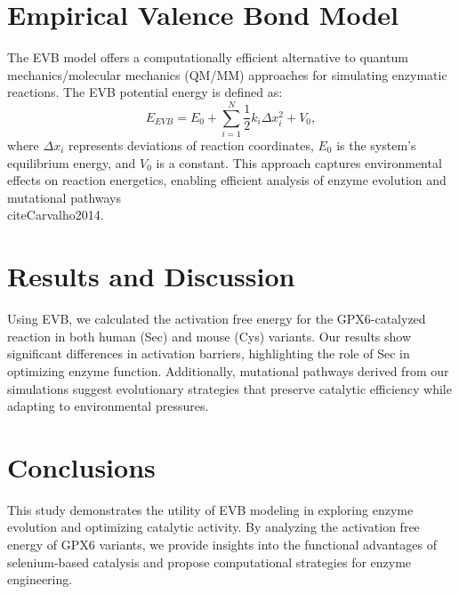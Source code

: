 \documentclass[journal=jacsat,manuscript=article]{achemso}
\begin{document}
\section{Empirical Valence Bond Model}

The EVB model offers a computationally efficient alternative to quantum mechanics/molecular mechanics (QM/MM) approaches for simulating enzymatic reactions. The EVB potential energy is defined as:
\begin{equation}
    E_{EVB} = E_{0} + \sum_{i=1}^{N} \frac{1}{2} k_i \Delta x_i^2 + V_{0},
\end{equation}
where \(\Delta x_i\) represents deviations of reaction coordinates, \(E_0\) is the system's equilibrium energy, and \(V_0\) is a constant. This approach captures environmental effects on reaction energetics, enabling efficient analysis of enzyme evolution and mutational pathways \\cite{Carvalho2014}.

\section{Results and Discussion}

Using EVB, we calculated the activation free energy for the GPX6-catalyzed reaction in both human (Sec) and mouse (Cys) variants. Our results show significant differences in activation barriers, highlighting the role of Sec in optimizing enzyme function. Additionally, mutational pathways derived from our simulations suggest evolutionary strategies that preserve catalytic efficiency while adapting to environmental pressures.

\section{Conclusions}

This study demonstrates the utility of EVB modeling in exploring enzyme evolution and optimizing catalytic activity. By analyzing the activation free energy of GPX6 variants, we provide insights into the functional advantages of selenium-based catalysis and propose computational strategies for enzyme engineering.



\end{document}

